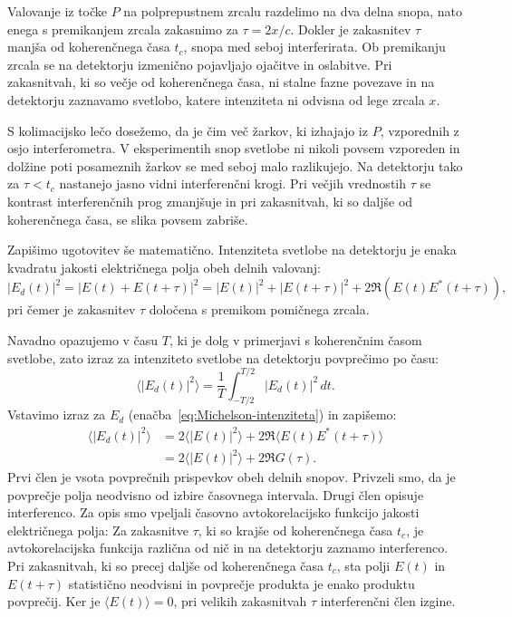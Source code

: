Valovanje iz točke $P$ na polprepustnem zrcalu razdelimo na dva delna snopa, 
nato enega s premikanjem zrcala zakasnimo za $\tau=2x/c$. Dokler je zakasnitev
$\tau$ manjša od koherenčnega časa $t_{c}$, snopa med seboj interferirata.
Ob premikanju zrcala se na detektorju izmenično pojavljajo ojačitve in 
oslabitve. Pri zakasnitvah, ki so večje od koherenčnega časa, ni stalne fazne 
povezave in na detektorju zaznavamo svetlobo, katere intenziteta ni odvisna od lege
zrcala $x$.

\begin{remark}
S kolimacijsko lečo dosežemo, da je čim več žarkov, ki izhajajo iz
$P$, vzporednih z osjo interferometra. V eksperimentih snop svetlobe 
ni nikoli povsem vzporeden in dolžine poti posameznih žarkov se med
seboj malo razlikujejo. Na detektorju tako za $\tau < t_c$ nastanejo jasno 
vidni interferenčni krogi. Pri večjih vrednostih $\tau$  se kontrast interferenčnih
prog zmanjšuje in pri zakasnitvah, ki so daljše od koherenčnega časa, se 
slika povsem zabriše. 
\end{remark}

Zapišimo ugotovitev še matematično.
Intenziteta svetlobe na detektorju je enaka kvadratu jakosti električnega
polja obeh delnih valovanj:
\begin{equation}
|E_{d}(t)|^{2}=|E(t)+E(t+\tau)|^{2}=|E(t)|^{2}+|E(t+\tau)|^{2}+2\Re \left(E(t)E^{*}(t+\tau)\right)\!\!,
\label{eq:Michelson-intenziteta}
\end{equation}
pri čemer je zakasnitev $\tau$ določena s premikom pomičnega zrcala.

Navadno opazujemo v času $T$, ki je dolg v primerjavi s koherenčnim
časom svetlobe, zato izraz za intenziteto svetlobe na detektorju povprečimo po času:
\begin{equation}
\langle|E_{d}(t)|^{2}\rangle = \frac{1}{T}\int_{-T/2}^{T/2}|E{}_{d}(t)|^{2}\, dt.
\end{equation}
Vstavimo izraz za $E_d$ (enačba~\ref{eq:Michelson-intenziteta}) in zapišemo:
\begin{align}
\langle|E_{d}(t)|^{2}\rangle & = 2\langle|E(t)|^{2}\rangle+2\Re\langle E(t)E^{*}(t+\tau)\rangle \nonumber \\ 
&=2\langle|E(t)|^{2}\rangle+2\Re G(\tau).
 \label{eq:caskohav}
\end{align}
Prvi člen je vsota povprečnih prispevkov obeh delnih snopov. Privzeli smo, 
da je povprečje polja neodvisno od izbire časovnega intervala.
Drugi člen opisuje interferenco. 
Za opis smo vpeljali
časovno avtokorelacijsko funkcijo
jakosti električnega polja:
Za zakasnitve $\tau$, ki so krajše od koherenčnega časa $t_c$, je avtokorelacijska
funkcija različna od nič in na
detektorju zaznamo interferenco. Pri zakasnitvah, ki so precej
daljše od koherenčnega časa $t_{c}$, sta polji $E(t)$ in $E(t+\tau)$
statistično neodvisni in povprečje produkta je enako produktu povprečij.
Ker je $\langle E(t)\rangle=0$, pri velikih zakasnitvah $\tau$ interferenčni
člen izgine.

